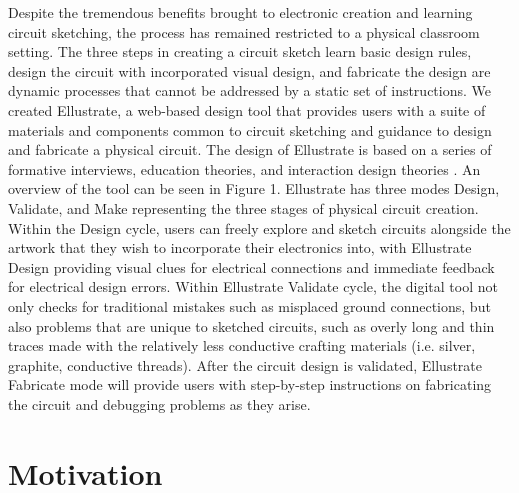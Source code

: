 \documentclass{sigchi}
\begin{document}
Despite the tremendous benefits brought to electronic creation and learning circuit sketching, the process has remained restricted to a physical classroom setting. 
The three steps in creating a circuit sketch \textendash learn basic design rules, design the circuit with incorporated visual design, and fabricate the design \textendash are dynamic processes that cannot be addressed by a static set of instructions. 
We created Ellustrate, a web-based design tool that provides users with a suite of materials and components common to circuit sketching and guidance to design and fabricate a physical circuit. 
The design of Ellustrate is based on a series of formative interviews, education theories, and interaction design theories .
An overview of the tool can be seen in Figure 1. Ellustrate has three modes \textendash Design, Validate, and Make \textendash representing the three stages of physical circuit creation.
Within the Design cycle, users can freely explore and sketch circuits alongside the artwork that they wish to incorporate their electronics into, with Ellustrate Design providing visual clues for electrical connections and immediate feedback for electrical design errors.
Within Ellustrate Validate cycle, the digital tool not only checks for traditional mistakes such as misplaced ground connections, but also problems that are unique to sketched circuits, such as overly long and thin traces made with the relatively less conductive crafting materials (i.e. silver, graphite, conductive threads). After the circuit design is validated, Ellustrate Fabricate mode will provide users with step-by-step instructions on fabricating the circuit and debugging problems as they arise. 

\section{Motivation}
\end{document}
